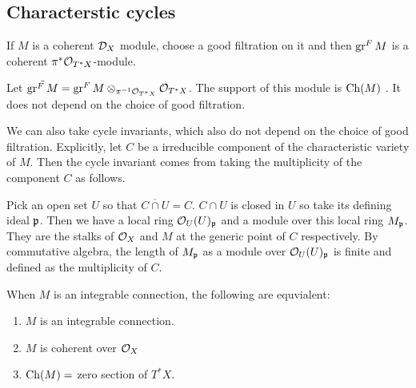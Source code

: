 \subsection{Characterstic cycles}
If $M$ is a coherent ${\mathcal{D}}_X$ module, choose a good filtration on it and then
$\operatorname{gr}^F M$ is a coherent $\pi^*{\mathcal{O}}_{T^*X}$-module.

\begin{definition}
	Let $\tilde{\operatorname{gr}^F M} = \operatorname{gr}^F M\otimes_{\pi^{-1}{\mathcal{O}}_{T^*X}} {\mathcal{O}}_{T^*X}$. The support of this module
	is $\operatorname{Ch}(M)$ . It does not depend on the choice of good filtration.
\end{definition}

\begin{remark}
	We can also take cycle invariants, which also do not depend on the choice of good filtration. Explicitly,
	let $C$ be a irreducible component of the characteristic variety of $M$. Then the cycle invariant comes from taking the
	multiplicity of the component $C$ as follows.

	\hfill

	Pick an open set $U$ so that $\overline{C\cap U} = C$.  $C\cap U$ is closed
	in $U$ so take its defining ideal $\mathfrak{p}$. Then we
	have a local ring ${\mathcal{O}}_U(U)_{\mathfrak{p}}$ and a module over this local ring $M_{\mathfrak{p}}$.
	They are the stalks of $ {\mathcal{O}}_X$ and $M$ at the generic point of $C$ respectively. By commutative algebra,
	the length of $M_{\mathfrak{p}}$ as a module over ${\mathcal{O}}_U(U)_{\mathfrak{p}}$ is finite and defined as the multiplicity of $C$.
\end{remark}

\begin{example}
	When $M$ is an integrable connection, the following are equvialent:
	\begin{enumerate}
		\item $M$ is an integrable connection.
		\item $M$ is coherent over ${\mathcal{O}}_X$
		\item $\operatorname{Ch}(M) = $ zero section of $T^*X$.
	\end{enumerate}
\end{example}

